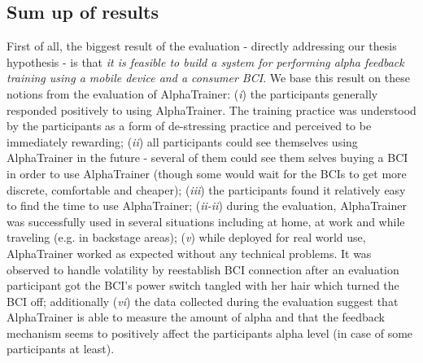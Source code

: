 \documentclass[a4paper,10pt,english,lof,lot,twoside]{puthesis}
\begin{document}
\subsection{Sum up of results}
\label{ch-evaluation/index:sum-up-of-results}\label{ch-evaluation/index:table-logged-data-avg-alpha-baseline-per-user}
First of all, the biggest result of the evaluation - directly addressing our thesis hypothesis - is that \emph{it is feasible to build a system for performing alpha feedback training using a mobile device and a consumer BCI}. We base this result on these notions from the evaluation of AlphaTrainer: (\emph{i}) the participants generally responded positively to using AlphaTrainer. The training practice was understood by the participants as a form of de-stressing practice and perceived to be immediately rewarding; (\emph{ii}) all participants could see themselves using AlphaTrainer in the future - several of them could see them selves buying a BCI in order to use AlphaTrainer (though some would wait for the BCIs to get more discrete, comfortable and cheaper); (\emph{iii}) the participants found it relatively easy to find the time to use AlphaTrainer; (\emph{ii-ii}) during the evaluation, AlphaTrainer was successfully used in several situations including at home, at work and while traveling (e.g. in backstage areas); (\emph{v}) while deployed for real world use, AlphaTrainer worked as expected without any technical problems. It was observed to handle volatility by reestablish BCI connection after an evaluation participant got the BCI's power switch tangled with her hair which turned the BCI off; additionally (\emph{vi}) the data collected during the evaluation suggest that AlphaTrainer is able to measure the amount of alpha and that the feedback mechanism seems to positively affect the participants alpha level (in case of some participants at least).
\end{document}
